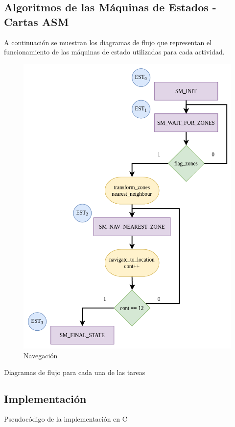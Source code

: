 \subsection{Algoritmos de las Máquinas de Estados - Cartas ASM}
A continuación se muestran los diagramas de flujo que representan el funcionamiento de las máquinas de estado utilizadas para cada actividad.

\begin{figure}[ht]
    \centering
    \includegraphics[scale= 0.4]{Figures/Navigation_CT.png}
        \caption{Navegación}
        \label{fig:ASM_Navigation}
    \end{figure}
Diagramas de flujo para cada una de las tareas

\subsection{Implementación}
Pseudocódigo de la implementación en C